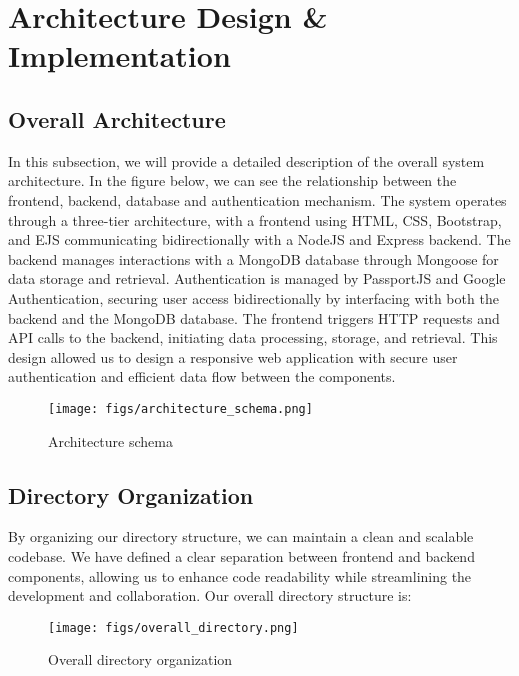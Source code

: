 \documentclass[conference]{IEEEtran}
\begin{document}
\section{Architecture Design \& Implementation}
\subsection{Overall Architecture}
In this subsection, we will provide a detailed description of the overall system architecture. In the figure below, we can see the relationship between the frontend, backend, database and authentication mechanism. The system operates through a three-tier architecture, with a frontend using HTML, CSS, Bootstrap, and EJS communicating bidirectionally with a NodeJS and Express backend. The backend manages interactions with a MongoDB database through Mongoose for data storage and retrieval. Authentication is managed by PassportJS and Google Authentication, securing user access bidirectionally by interfacing with both the backend and the MongoDB database. The frontend triggers HTTP requests and API calls to the backend, initiating data processing, storage, and retrieval. This design allowed us to design a responsive web application with secure user authentication and efficient data flow between the components.
\begin{figure}[H]
\centering
\texttt{[image: figs/architecture\_schema.png]}
\caption{Architecture schema}
\label{fig:Architecture schema}
\end{figure}
\subsection{Directory Organization}
By organizing our directory structure, we can maintain a clean and scalable codebase. We have defined a clear separation between frontend and backend components, allowing us to enhance code readability while streamlining the development and collaboration. Our overall directory structure is:
\begin{figure}[H]
\centering
\texttt{[image: figs/overall\_directory.png]}
\caption{Overall directory organization}
\label{fig:Overall directory organization}
\end{figure}
\end{document}
